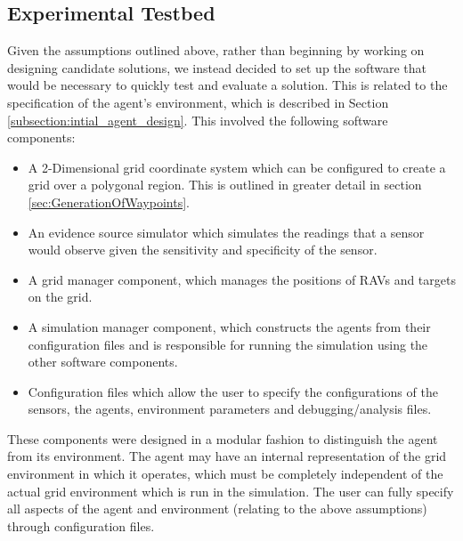 \subsection{Experimental Testbed}
Given the assumptions outlined above, rather than beginning by working on designing candidate solutions, we instead decided to set up the software that would be necessary to quickly test and evaluate a solution. This is related to the specification of the agent's environment, which is described in Section \ref{subsection:intial_agent_design}. This involved the following software components:
\begin{itemize}
    \item A 2-Dimensional grid coordinate system which can be configured to create a grid over a polygonal region. This is outlined in greater detail in section \ref{sec:GenerationOfWaypoints}.
    \item An evidence source simulator which simulates the readings that a sensor would observe given the sensitivity and specificity of the sensor.
    \item A grid manager component, which manages the positions of RAVs and targets on the grid.
    \item A simulation manager component, which constructs the agents from their configuration files and is responsible for running the simulation using the other software components.
    \item Configuration files which allow the user to specify the configurations of the sensors, the agents, environment parameters and debugging/analysis files.
\end{itemize}
These components were designed in a modular fashion to distinguish the agent from its environment.%
 The agent may have an internal representation of the grid environment in which it operates, which must be completely independent of the actual grid environment which is run in the simulation. The user can fully specify all aspects of the agent and environment (relating to the above assumptions) through configuration files. 
